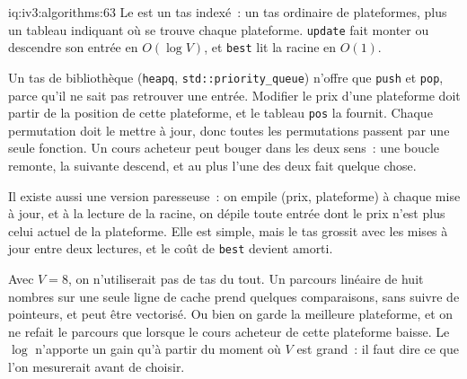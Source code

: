 \begin{solution}{iq:iv3:algorithms:63}
Le  est un tas indexé~: un tas ordinaire de plateformes, plus un tableau indiquant où se trouve chaque plateforme. \texttt{update} fait monter ou descendre son entrée en $O(\log V)$, et \texttt{best} lit la racine en $O(1)$.
\label{lst:iv3:al:bestvenue}

Un tas de bibliothèque (\texttt{heapq}, \texttt{std::priority\_queue}) n'offre que \texttt{push} et \texttt{pop}, parce qu'il ne sait pas retrouver une entrée. Modifier le prix d'une plateforme doit partir de la position de cette plateforme, et le tableau \texttt{pos} la fournit. Chaque permutation doit le mettre à jour, donc toutes les permutations passent par une seule fonction. Un cours acheteur peut bouger dans les deux sens~: une boucle remonte, la suivante descend, et au plus l'une des deux fait quelque chose.

Il existe aussi une version paresseuse~: on empile (prix, plateforme) à chaque mise à jour, et à la lecture de la racine, on dépile toute entrée dont le prix n'est plus celui actuel de la plateforme. Elle est simple, mais le tas grossit avec les mises à jour entre deux lectures, et le coût de \texttt{best} devient amorti.

Avec $V = 8$, on n'utiliserait pas de tas du tout. Un parcours linéaire de huit nombres sur une seule ligne de cache prend quelques comparaisons, sans suivre de pointeurs, et peut être vectorisé. Ou bien on garde la meilleure plateforme, et on ne refait le parcours que lorsque le cours acheteur de cette plateforme baisse. Le $\log$ n'apporte un gain qu'à partir du moment où $V$ est grand~: il faut dire ce que l'on mesurerait avant de choisir.

\end{solution}

